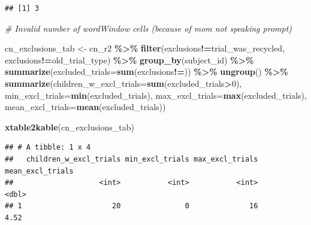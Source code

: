 \documentclass[
  doc,floatsintext]{apa6}
\newenvironment{Shaded}{\begin{snugshade}}{\end{snugshade}}
\newcommand{\AttributeTok}[1]{\textcolor[rgb]{0.13,0.29,0.53}{#1}}
\newcommand{\CommentTok}[1]{\textcolor[rgb]{0.56,0.35,0.01}{\textit{#1}}}
\newcommand{\DecValTok}[1]{\textcolor[rgb]{0.00,0.00,0.81}{#1}}
\newcommand{\FunctionTok}[1]{\textcolor[rgb]{0.13,0.29,0.53}{\textbf{#1}}}
\newcommand{\NormalTok}[1]{#1}
\newcommand{\OtherTok}[1]{\textcolor[rgb]{0.56,0.35,0.01}{#1}}
\newcommand{\SpecialCharTok}[1]{\textcolor[rgb]{0.81,0.36,0.00}{\textbf{#1}}}
\newcommand{\StringTok}[1]{\textcolor[rgb]{0.31,0.60,0.02}{#1}}
\begin{document}
\begin{verbatim}
## [1] 3
\end{verbatim}

\begin{Shaded}
\begin{Highlighting}[]
\CommentTok{\# \textquotesingle{}Invalid number of wordWindow cells\textquotesingle{} (because of mom not speaking prompt)\textquotesingle{} }
\end{Highlighting}
\end{Shaded}

\begin{Shaded}
\begin{Highlighting}[]
\NormalTok{cn\_exclusions\_tab }\OtherTok{\textless{}{-}}\NormalTok{ cn\_r2 }\SpecialCharTok{\%\textgreater{}\%}
  \FunctionTok{filter}\NormalTok{(exclusions}\SpecialCharTok{!=}\StringTok{\textquotesingle{}trial\_was\_recycled\textquotesingle{}}\NormalTok{,}
\NormalTok{         exclusions}\SpecialCharTok{!=}\StringTok{\textquotesingle{}old\_trial\_type\textquotesingle{}}\NormalTok{) }\SpecialCharTok{\%\textgreater{}\%}
  \FunctionTok{group\_by}\NormalTok{(subject\_id) }\SpecialCharTok{\%\textgreater{}\%}
  \FunctionTok{summarize}\NormalTok{(}\AttributeTok{excluded\_trials=}\FunctionTok{sum}\NormalTok{(exclusions}\SpecialCharTok{!=}\StringTok{\textquotesingle{}\textquotesingle{}}\NormalTok{)) }\SpecialCharTok{\%\textgreater{}\%}
  \FunctionTok{ungroup}\NormalTok{() }\SpecialCharTok{\%\textgreater{}\%}
  \FunctionTok{summarize}\NormalTok{(}\AttributeTok{children\_w\_excl\_trials=}\FunctionTok{sum}\NormalTok{(excluded\_trials}\SpecialCharTok{\textgreater{}}\DecValTok{0}\NormalTok{),}
            \AttributeTok{min\_excl\_trials=}\FunctionTok{min}\NormalTok{(excluded\_trials),}
            \AttributeTok{max\_excl\_trials=}\FunctionTok{max}\NormalTok{(excluded\_trials),}
            \AttributeTok{mean\_excl\_trials=}\FunctionTok{mean}\NormalTok{(excluded\_trials))}

\FunctionTok{xtable2kable}\NormalTok{(cn\_exclusions\_tab)}
\end{Highlighting}
\end{Shaded}

\begin{verbatim}
## # A tibble: 1 x 4
##   children_w_excl_trials min_excl_trials max_excl_trials mean_excl_trials
##                    <int>           <int>           <int>            <dbl>
## 1                     20               0              16             4.52
\end{verbatim}
\end{document}
